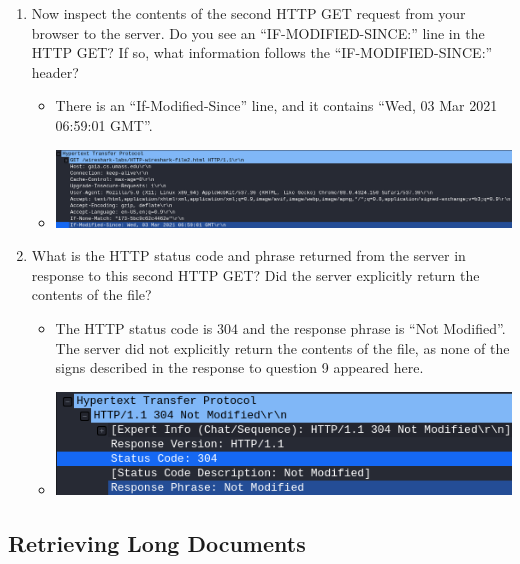 \documentclass[11pt]{article}
\begin{document}
\begin{enumerate}
\begin{itemize}
  \end{itemize}
\item Now inspect the contents of the second HTTP GET request from your browser
  to the server.  Do you see an ``IF-MODIFIED-SINCE:'' line in the HTTP GET?  If
  so, what information follows the ``IF-MODIFIED-SINCE:'' header?
  \begin{itemize}
  \item There is an ``If-Modified-Since'' line, and it contains ``Wed, 03 Mar
    2021 06:59:01 GMT''.
  \item \includegraphics[width=\textwidth]{img/ws-if-modified-since-2}
  \end{itemize}
\item What is the HTTP status code and phrase returned from the server in
  response to this second HTTP GET?  Did the server explicitly return the
  contents of the file?
  \begin{itemize}
  \item The HTTP status code is $304$ and the response phrase is ``Not
    Modified''.  The server did not explicitly return the contents of the file,
    as none of the signs described in the response to question 9 appeared
    here.
  \item \includegraphics[width=\textwidth]{img/ws-conditional-status-phrase}
  \end{itemize}
\end{enumerate}

\subsection{Retrieving Long Documents}
\end{document}
